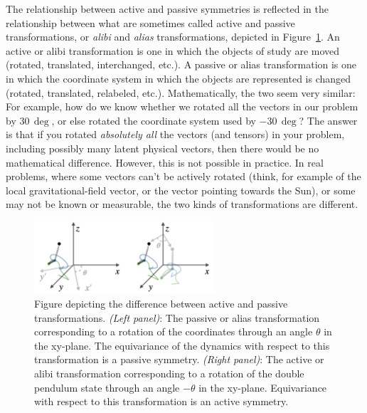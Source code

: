 \documentclass[]{article} %
\newcommand{\figref}[1]{Figure~\ref{#1}}
\begin{document}
The relationship between active and passive symmetries is reflected in the relationship between what are sometimes called active and passive transformations, or \emph{alibi} and \emph{alias} transformations, depicted in \figref{fig:alias}.
An active or alibi transformation is one in which the objects of study are moved (rotated, translated, interchanged, etc.).
A passive or alias transformation is one in which the coordinate system in which the objects are represented is changed (rotated, translated, relabeled, etc.).
Mathematically, the two seem very similar:
For example, how do we know whether we rotated all the vectors in our problem by $30\,\deg$, or else rotated the coordinate system used by $-30\,\deg$?
The answer is that if you rotated \emph{absolutely all} the vectors (and tensors) in your problem, including possibly many latent physical vectors, then there would be no mathematical difference. However, this is not possible in practice. 
In real problems, where some vectors can't be actively rotated (think, for example of the local gravitational-field vector, or the vector pointing towards the Sun), or some may not be known or measurable, the two kinds of transformations are different.
\begin{figure}[t!]
    \centering
    \includegraphics[width=0.6\textwidth]{alias.png}
    \caption{Figure depicting the difference between active and passive transformations. \textsl{(Left panel)}: The passive or alias transformation corresponding to a rotation of the coordinates through an angle $\theta$ in the xy-plane. The equivariance of the dynamics with respect to this transformation is a passive symmetry. \textsl{(Right panel)}: The active or alibi transformation corresponding to a rotation of the double pendulum state through an angle $-\theta$ in the xy-plane. Equivariance with respect to this transformation is an active symmetry.}
    \label{fig:alias}
\end{figure}
\end{document}
